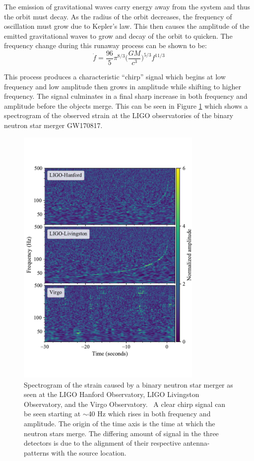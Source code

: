 \documentclass [12pt, proquest]{uwthesis}[2019]
\begin{document}
The emission of gravitational waves carry energy away from the system and thus the orbit must decay. As the radius of the orbit decreases, the frequency of oscillation must grow due to Kepler's law. This then causes the amplitude of the emitted gravitational waves to grow and decay of the orbit to quicken. The frequency change during this runaway process can be shown to be:
\begin{equation}
\dot{f}=\frac{96}{5}\pi^{8/3}\bigg(\frac{G M}{c^3}\bigg)^{5/3} f^{11/3}
\end{equation}

This process produces a characteristic ``chirp'' signal which begins at low frequency and low amplitude then grows in amplitude while shifting to higher frequency. The signal culminates in a final sharp increase in both frequency and amplitude before the objects merge. This can be seen in Figure \ref{GW170817} which shows a spectrogram of the observed strain at the LIGO observatories of the binary neutron star merger GW170817.
 
\begin{figure}
\begin{center}
\includegraphics[width=0.8\textwidth]{GW170817.pdf}
\caption[Spectrogram of the strain caused by a binary neutron star merger]{Spectrogram of the strain caused by a binary neutron star merger as seen at the LIGO Hanford Observatory, LIGO Livingston Observatory, and the Virgo Observatory.~\cite{GW170817} A clear chirp signal can be seen starting at $\sim$40 Hz which rises in both frequency and amplitude. The origin of the time axis is the time at which the neutron stars merge. The differing amount of signal in the three detectors is due to the alignment of their respective antenna-patterns with the source location.}
\label{GW170817}
\end{center}
\end{figure}
 
\end{document}
